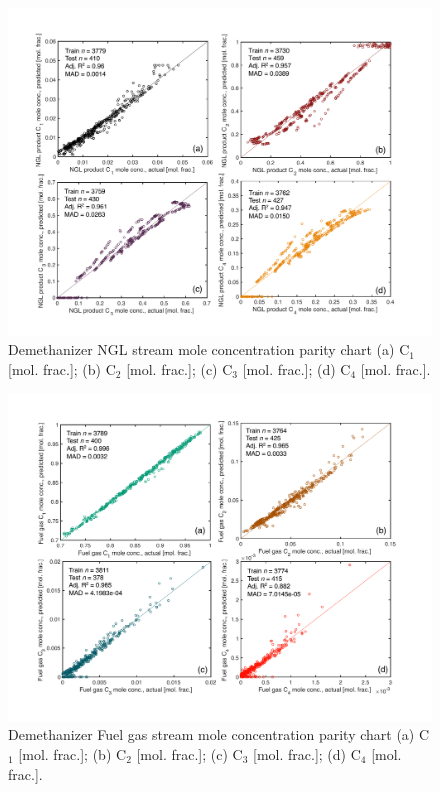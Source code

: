 \documentclass[11pt]{report}
\begin{document}
\begin{figure}
\includegraphics[width=0.85\columnwidth]{images/demethanizer_NGL.pdf}
\caption{Demethanizer NGL stream mole concentration parity chart (a) C$_1$ [mol. frac.]; (b) C$_2$ [mol. frac.]; (c) C$_3$ [mol. frac.]; (d) C$_4$ [mol. frac.].}
\label{fig:demethanizer_NGL}
\end{figure}
\begin{figure}
\includegraphics[width=0.85\columnwidth]{images/demethanizer_Fuelgas.pdf}
\caption{Demethanizer Fuel gas stream mole concentration parity chart (a) C$_1$ [mol. frac.]; (b) C$_2$ [mol. frac.]; (c) C$_3$ [mol. frac.]; (d) C$_4$ [mol. frac.].}
\label{fig:demethanizer_Fuelgas}
\end{figure}

\clearpage
\end{document}
